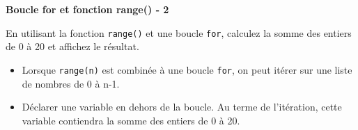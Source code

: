     \begin{Exercice}[5 minutes] \textbf{Boucle for et fonction range() - 2}
      	
      	En utilisant la fonction \lstinline{range()} et une boucle \lstinline{for}, calculez la somme des entiers de 0 à 20 et affichez le résultat.
    
        \begin{conseil}
           \begin{itemize}
           	\item Lorsque \lstinline{range(n)} est combinée à une boucle \lstinline{for}, on peut itérer sur une liste de nombres de 0 à n-1.
           	\item Déclarer une variable en dehors de la boucle. Au terme de l'itération, cette variable contiendra la somme des entiers de 0 à 20.
           \end{itemize}
		     
        \end{conseil}
        
        \begin{solution}
            
        \end{solution}
    \end{Exercice}

    

